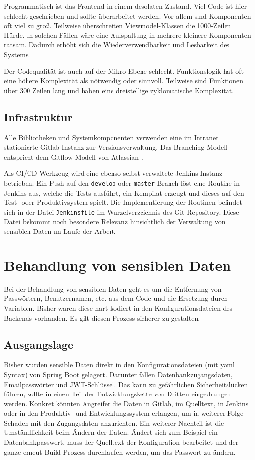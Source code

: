 Programmatisch ist das Frontend in einem desolaten Zustand. Viel Code ist hier schlecht geschrieben und sollte überarbeitet werden. Vor allem sind Komponenten oft viel zu groß. Teilweise überschreiten Viewmodel-Klassen die 1000-Zeilen Hürde. In solchen Fällen wäre eine Aufspaltung in mehrere kleinere Komponenten ratsam. Dadurch erhöht sich die Wiederverwendbarkeit und Lesbarkeit des Systems.

Der Codequalität ist auch auf der Mikro-Ebene schlecht. Funktionslogik hat oft eine höhere Komplexität als nötwendig oder sinnvoll. Teilweise sind Funktionen über 300 Zeilen lang und haben eine dreistellige zyklomatische Komplexität. 

\subsection{Infrastruktur}

Alle Bibliotheken und Systemkomponenten verwenden eine im Intranet stationierte Gitlab-Instanz zur Versionsverwaltung. Das Branching-Modell entspricht dem Gitflow-Modell von Atlassian~\parencite{gitflow}.

Als CI/CD-Werkzeug wird eine ebenso selbst verwaltete Jenkins-Instanz betrieben. Ein Push auf den \texttt{develop} oder \texttt{master}-Branch löst eine Routine in Jenkins aus, welche die Tests ausführt, ein Kompilat erzeugt und dieses auf den Test- oder Produktivsystem spielt. Die Implementierung der Routinen befindet sich in der Datei \texttt{Jenkinsfile} im Wurzelverzeichnis des Git-Repository. Diese Datei bekommt noch besondere Relevanz hinsichtlich der Verwaltung von sensiblen Daten im Laufe der Arbeit.

\section{Behandlung von sensiblen Daten}
\label{sec:design_sensitive_data}

Bei der Behandlung von sensiblen Daten geht es um die Entfernung von Passwörtern, Benutzernamen, etc. aus dem Code und die Ersetzung durch Variablen. Bisher waren diese hart kodiert in den Konfigurationsdateien des Backends vorhanden. Es gilt diesen Prozess sicherer zu gestalten.

\subsection{Ausgangslage}

Bisher wurden sensible Daten direkt in den Konfigurationsdateien (mit yaml Syntax) von Spring Boot gelagert. Darunter fallen Datenbankzugangsdaten, Emailpasswörter und JWT-Schlüssel. Das kann zu gefährlichen Sicherheitslücken führen, sollte in einen Teil der Entwicklungskette von Dritten eingedrungen werden. Konkret könnten Angreifer die Daten in Gitlab, im Quelltext, in Jenkins oder in den Produktiv- und Entwicklungssystem erlangen, um in weiterer Folge Schaden mit den Zugangsdaten anzurichten. Ein weiterer Nachteil ist die Umständlichkeit beim Ändern der Daten. Ändert sich zum Beispiel ein Datenbankpasswort, muss der Quelltext der Konfiguration bearbeitet und der ganze erneut Build-Prozess durchlaufen werden, um das Passwort zu ändern.

